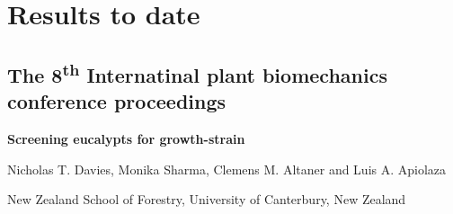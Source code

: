 \section{Results to date}
\subsection{ The 8\textsuperscript{th} Internatinal plant biomechanics conference proceedings}

\large{\textbf{Screening eucalypts for growth-strain}}

Nicholas T. Davies, Monika Sharma, Clemens M. Altaner and Luis A. Apiolaza

New Zealand School of Forestry, University of Canterbury, New Zealand



